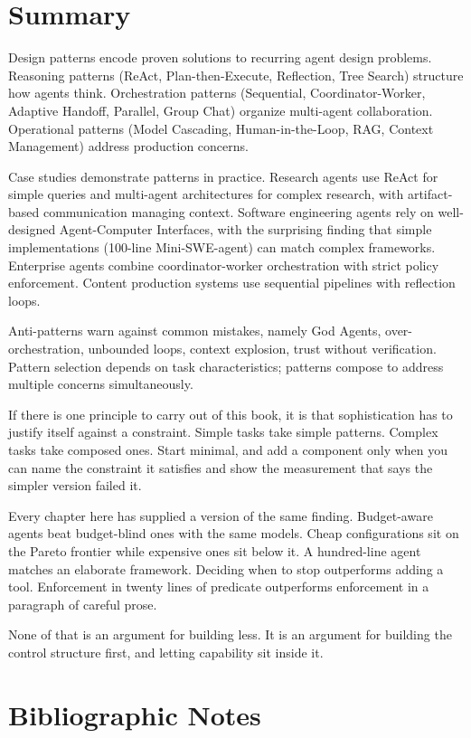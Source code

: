 \section{Summary}

Design patterns encode proven solutions to recurring agent design problems. Reasoning patterns (ReAct, Plan-then-Execute, Reflection, Tree Search) structure how agents think. Orchestration patterns (Sequential, Coordinator-Worker, Adaptive Handoff, Parallel, Group Chat) organize multi-agent collaboration. Operational patterns (Model Cascading, Human-in-the-Loop, RAG, Context Management) address production concerns.

Case studies demonstrate patterns in practice. Research agents use ReAct for simple queries and multi-agent architectures for complex research, with artifact-based communication managing context. Software engineering agents rely on well-designed Agent-Computer Interfaces, with the surprising finding that simple implementations (100-line Mini-SWE-agent) can match complex frameworks. Enterprise agents combine coordinator-worker orchestration with strict policy enforcement. Content production systems use sequential pipelines with reflection loops.

Anti-patterns warn against common mistakes, namely God Agents, over-orchestration, unbounded loops, context explosion, trust without verification. Pattern selection depends on task characteristics; patterns compose to address multiple concerns simultaneously.

If there is one principle to carry out of this book, it is that sophistication has
to justify itself against a constraint. Simple tasks take simple patterns.
Complex tasks take composed ones. Start minimal, and add a component only when you
can name the constraint it satisfies and show the measurement that says the
simpler version failed it.

Every chapter here has supplied a version of the same finding. Budget-aware agents
beat budget-blind ones with the same models. Cheap configurations sit on the
Pareto frontier while expensive ones sit below it. A hundred-line agent matches an
elaborate framework. Deciding when to stop outperforms adding a tool. Enforcement
in twenty lines of predicate outperforms enforcement in a paragraph of careful
prose.

None of that is an argument for building less. It is an argument for building the
control structure first, and letting capability sit inside it.

\section*{Bibliographic Notes}

